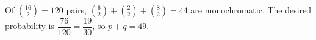 Of $\binom{16}{2}=120$ pairs, $\binom62+\binom22+\binom82=44$ are monochromatic. The desired probability is $\dfrac{76}{120}=\dfrac{19}{30}$, so $p+q=\boxed{49}$.
